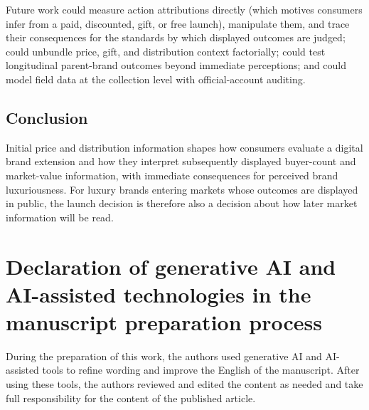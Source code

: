 \documentclass[12pt, a4paper]{article}
\begin{document}
Future work could measure action attributions directly (which motives consumers infer from a paid, discounted, gift, or free launch), manipulate them, and trace their consequences for the standards by which displayed outcomes are judged; could unbundle price, gift, and distribution context factorially; could test longitudinal parent-brand outcomes beyond immediate perceptions; and could model field data at the collection level with official-account auditing.

\subsection{Conclusion}

Initial price and distribution information shapes how consumers evaluate a digital brand extension and how they interpret subsequently displayed buyer-count and market-value information, with immediate consequences for perceived brand luxuriousness. For luxury brands entering markets whose outcomes are displayed in public, the launch decision is therefore also a decision about how later market information will be read.

\newpage
\section*{Declaration of generative AI and AI-assisted technologies in the manuscript preparation process}

During the preparation of this work, the authors used generative AI and AI-assisted tools to refine wording and improve the English of the manuscript. After using these tools, the authors reviewed and edited the content as needed and take full responsibility for the content of the published article.

\newpage
\end{document}
